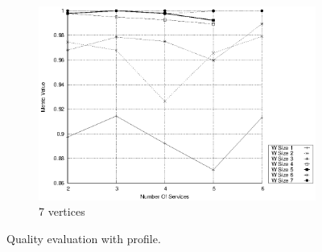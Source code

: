 \begin{figure}[!htb]
\begin{subfigure}{0.33\textwidth}
    \includegraphics[width=\textwidth]{Images/graphs/window_quality_performance_diff_qual_n7_s7_20_100_n7}
    \caption{7 vertices}
    \label{fig:quality_window_wide_qualitative_n7}
  \end{subfigure}

  \caption{ Quality evaluation with \wide profile.}
  \label{fig:quality_window_wide_qualitative}
\end{figure}

